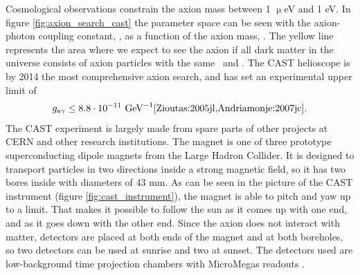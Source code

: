 Cosmological observations constrain the axion mass between 1 $\upmu$eV and 1 eV. In figure \ref{fig:axion_search_cast} the parameter space can be seen with the axion-photon coupling constant, \gay, as a function of the axion mass, \maxion. The yellow line represents the area where we expect to see the axion if all dark matter in the universe consists of axion particles with the same \maxion\ and \gay. The CAST helioscope is by 2014 the most comprehensive axion search, and has set an experimental upper limit of
\begin{eqnarray}
g_{\textrm{a$\gamma$}} \leq 8.8 \cdot 10^{-11} \textrm{ GeV}^{-1}\cite{Zioutas:2005jl,Andriamonje:2007jc}.
\end{eqnarray}
The CAST experiment is largely made from spare parts of other projects at CERN and other research institutions. The magnet is one of three prototype superconducting dipole magnets from the Large Hadron Collider. It is designed to transport particles in two directions inside a strong magnetic field, so it has two bores inside with diameters of 43 mm. As can be seen in the picture of the CAST instrument (figure \ref{fig:cast_instrument}), the magnet is able to pitch and yaw up to a limit. That makes it possible to follow the sun as it comes up with one end, and as it goes down with the other end. Since the axion does not interact with matter, detectors are placed at both ends of the magnet and at both boreholes, so two detectors can be used at sunrise and two at sunset. The detectors used are low-background time projection chambers with MicroMegas readouts \cite{Giomataris:1996eo,Giomataris:2006fy,Andriamonje:2010jh}.

